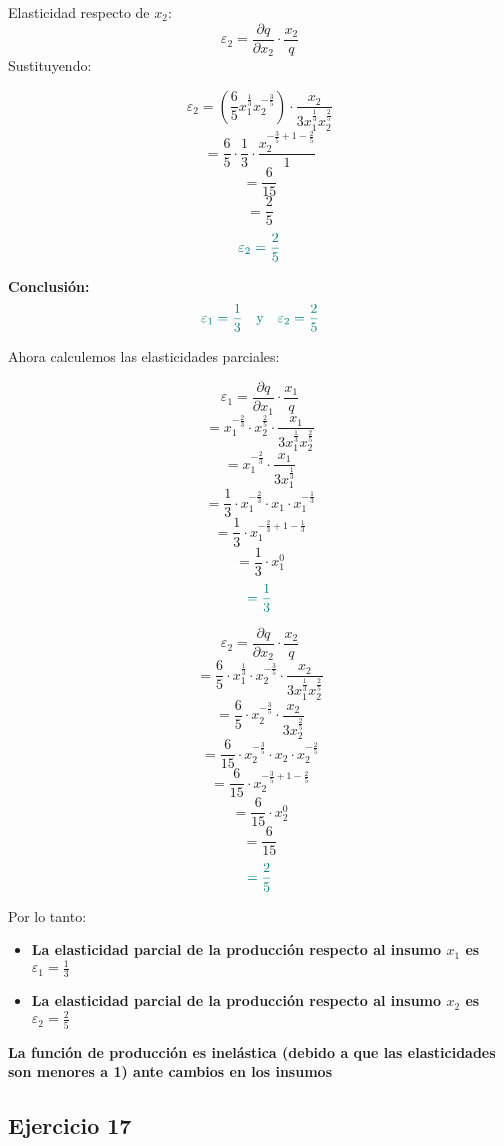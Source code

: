\documentclass{article}
\begin{document}
Elasticidad respecto de \(x_2\):
\[
\varepsilon_2 = \frac{\partial q}{\partial x_2} \cdot \frac{x_2}{q}
\]
Sustituyendo:

\[
\varepsilon_2 = \left(\frac{6}{5}x_1^{\frac{1}{3}}x_2^{-\frac{3}{5}}\right) \cdot \frac{x_2}{3x_1^{\frac{1}{3}}x_2^{\frac{2}{5}}}
\]
\[
= \frac{6}{5} \cdot \frac{1}{3} \cdot \frac{x_2^{-\frac{3}{5}+1-\frac{2}{5}}}{1}
\]
\[
= \frac{6}{15}
\]
\[
= \frac{2}{5}
\]
\[
\color{teal}
\varepsilon_2 = \frac{2}{5}
\]

\medskip

\textbf{Conclusión:}
\[
\color{teal}
\varepsilon_1 = \frac{1}{3}
\quad \text{y} \quad
\varepsilon_2 = \frac{2}{5}
\]

Ahora calculemos las elasticidades parciales:

\[
\varepsilon_1 = \frac{\partial q}{\partial x_1} \cdot \frac{x_1}{q}
\]
\[
= x_1^{-\frac{2}{3}} \cdot x_2^{\frac{2}{5}} \cdot \frac{x_1}{3x_1^{\frac{1}{3}}x_2^{\frac{2}{5}}}
\]
\[
= x_1^{-\frac{2}{3}} \cdot \frac{x_1}{3x_1^{\frac{1}{3}}}
\]
\[
= \frac{1}{3} \cdot x_1^{-\frac{2}{3}} \cdot x_1 \cdot x_1^{-\frac{1}{3}}
\]
\[
= \frac{1}{3} \cdot x_1^{-\frac{2}{3}+1-\frac{1}{3}}
\]
\[
= \frac{1}{3} \cdot x_1^{0}
\]
\[
\color{teal}
= \frac{1}{3}
\]

\[
\varepsilon_2 = \frac{\partial q}{\partial x_2} \cdot \frac{x_2}{q}
\]
\[
= \frac{6}{5} \cdot x_1^{\frac{1}{3}} \cdot x_2^{-\frac{3}{5}} \cdot \frac{x_2}{3x_1^{\frac{1}{3}}x_2^{\frac{2}{5}}}
\]
\[
= \frac{6}{5} \cdot x_2^{-\frac{3}{5}} \cdot \frac{x_2}{3x_2^{\frac{2}{5}}}
\]
\[
= \frac{6}{15} \cdot x_2^{-\frac{3}{5}} \cdot x_2 \cdot x_2^{-\frac{2}{5}}
\]
\[
= \frac{6}{15} \cdot x_2^{-\frac{3}{5}+1-\frac{2}{5}}
\]
\[
= \frac{6}{15} \cdot x_2^{0}
\]
\[
= \frac{6}{15}
\]
\[
\color{teal}
= \frac{2}{5}
\]

Por lo tanto:

\begin{itemize}
  \item \textbf{\color{teal}La elasticidad parcial de la producción respecto al insumo \(x_1\) es \(\varepsilon_1 = \frac{1}{3}\)}
  \item \textbf{\color{teal}La elasticidad parcial de la producción respecto al insumo \(x_2\) es \(\varepsilon_2 = \frac{2}{5}\)}
\end{itemize}

\textbf{\color{teal}La función de producción es inelástica (debido a que las elasticidades son menores a 1) ante cambios en los insumos}

\newpage
\subsection{Ejercicio 17}
\end{document}
